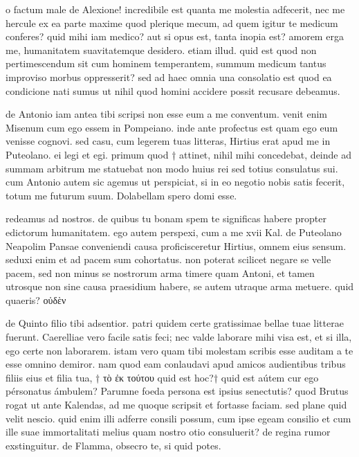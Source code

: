 


 o factum male de Alexione! incredibile est quanta me molestia adfecerit, nec me hercule ex ea parte maxime quod plerique mecum, ad quem igitur te medicum conferes? quid mihi iam medico? aut si opus est, tanta inopia est? amorem erga me, humanitatem suavitatemque desidero. etiam illud. quid est quod non pertimescendum sit cum hominem temperantem, summum medicum tantus improviso morbus oppresserit? sed ad haec omnia una consolatio est quod ea condicione nati sumus ut nihil quod homini accidere possit recusare debeamus.

 de Antonio iam antea tibi scripsi non esse eum a me conventum. venit enim Misenum cum ego essem in Pompeiano. inde ante profectus est quam ego eum venisse cognovi. sed casu, cum legerem tuas litteras, Hirtius erat apud me in Puteolano. ei legi et egi. primum quod † attinet, nihil mihi concedebat, deinde ad summam arbitrum me statuebat non modo huius rei sed totius consulatus sui. cum Antonio autem sic agemus ut perspiciat, si in eo negotio nobis satis fecerit, totum me futurum suum. Dolabellam spero domi esse.

 redeamus ad nostros. de quibus tu bonam spem te significas habere propter edictorum humanitatem. ego autem perspexi, cum a me xvii Kal. de Puteolano Neapolim Pansae conveniendi causa proficisceretur Hirtius, omnem eius sensum. seduxi enim et ad pacem sum cohortatus. non poterat scilicet negare se velle pacem, sed non minus se nostrorum arma timere quam Antoni, et tamen utrosque non sine causa praesidium habere, se autem utraque arma metuere. quid quaeris? οὐδὲν

 de Quinto filio tibi adsentior. patri quidem certe gratissimae bellae tuae litterae fuerunt. Caerelliae vero facile satis feci; nec valde laborare mihi visa est, et si illa, ego certe non laborarem. istam vero quam tibi molestam scribis esse auditam a te esse omnino demiror. nam quod eam conlaudavi apud amicos audientibus tribus filiis eius et filia tua, † τὸ ἐκ τούτου quid est hoc?† quid est aútem cur ego pérsonatus ámbulem? Parumne foeda persona est ipsius senectutis? quod Brutus rogat ut ante Kalendas, ad me quoque scripsit et fortasse faciam. sed plane quid velit nescio. quid enim illi adferre consili possum, cum ipse egeam consilio et cum ille suae immortalitati melius quam nostro otio consuluerit? de regina rumor exstinguitur. de Flamma, obsecro te, si quid potes.
